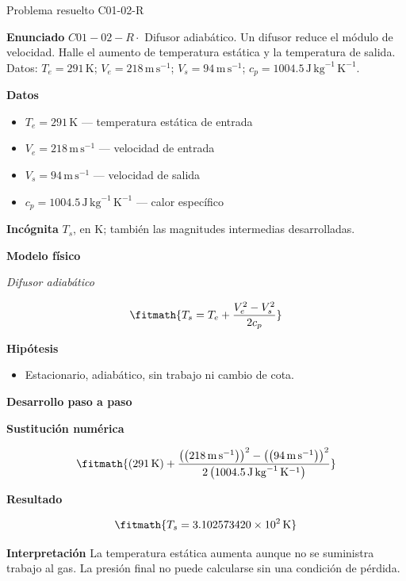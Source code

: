 \documentclass[10pt,openany]{book}
\begin{document}
\begin{studiumworked}{Problema resuelto C01-02-R}


\noindent\textbf{Enunciado}
\(C01-02-R \cdot\) Difusor adiabático. Un difusor reduce el módulo de velocidad. Halle el aumento de temperatura estática y la temperatura de salida. Datos: \(T_e=291\, \mathrm{K}\); \(V_e=218\, \mathrm{m}\,\mathrm{s}^{-1}\); \(V_s=94\, \mathrm{m}\,\mathrm{s}^{-1}\); \(c_p=1004.5\, \mathrm{J}\,\mathrm{kg}^{-1}\,\mathrm{K}^{-1}\).

\noindent\textbf{Datos}
\begin{itemize}
\item $T_e = 291\,\mathrm{K}$ — temperatura estática de entrada
\item $V_e = 218\,\mathrm{m}\,\mathrm{s}^{-1}$ — velocidad de entrada
\item $V_s = 94\,\mathrm{m}\,\mathrm{s}^{-1}$ — velocidad de salida
\item $c_p = 1004.5\,\mathrm{J}\,\mathrm{kg}^{-1}\,\mathrm{K}^{-1}$ — calor específico
\end{itemize}

\noindent\textbf{Incógnita}
$T_s$, en $\mathrm{K}$; también las magnitudes intermedias desarrolladas.

\noindent\textbf{Modelo físico}

\noindent\textit{Difusor adiabático}

\[
\fitmath{T_s=T_e + \frac{V_e^{2} - V_s^{2}}{2 c_p}}
\]

\noindent\textbf{Hipótesis}
\begin{itemize}
\item Estacionario, adiabático, sin trabajo ni cambio de cota.
\end{itemize}

\noindent\textbf{Desarrollo paso a paso}



\noindent\textbf{Sustitución numérica}

\[
\fitmath{\left(291\,\mathrm{K}\right) + \frac{\left(\left(218\,\mathrm{m}\,\mathrm{s}^{-1}\right)\right)^{2} - \left(\left(94\,\mathrm{m}\,\mathrm{s}^{-1}\right)\right)^{2}}{2 \left(1004.5\,\mathrm{J}\,\mathrm{kg}^{-1}\,\mathrm{K}^{-1}\right)}}
\]

\noindent\textbf{Resultado}

\[
\fitmath{T_s=3.102573420\times10^{2}\,\mathrm{K}}
\]

\noindent\textbf{Interpretación}
La temperatura estática aumenta aunque no se suministra trabajo al gas. La presión final no puede calcularse sin una condición de pérdida.


\end{studiumworked}
\end{document}
